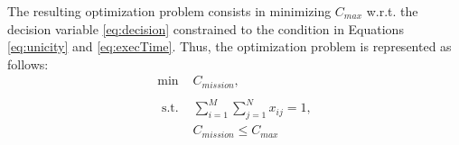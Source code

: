 \documentclass[conference,harvard,brazil,english]{sbatex}
\begin{document}
The resulting optimization problem consists in minimizing $C_{max}$ w.r.t. the decision variable \eqref{eq:decision} constrained to the condition in Equations \eqref{eq:unicity} and \eqref{eq:execTime}. Thus, the optimization problem is represented as follows:
%
\begin{equation}
	\label{eq:optproblem}
	\begin{array}{ccc}
		\min & C_{mission},  \\
  \\
		\textrm{ s.t. } & \sum_{i=1}^{M}{\sum_{j=1}^{N}{x_{ij}}}=1, \\
		& C_{mission}\leq C_{max}
 \\
	\end{array}
\end{equation}	
%
%
%
%
%
%
%
%
%
%
%
%
\end{document}
